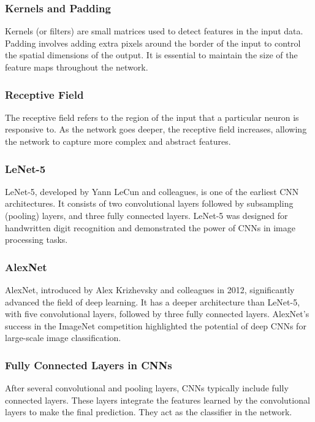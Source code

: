 \documentclass[english,11pt,a4paper,titlepage]{article}
\begin{document}
	\subsubsection*{Kernels and Padding}
	Kernels (or filters) are small matrices used to detect features in the input data. Padding involves adding extra pixels around the border of the input to control the spatial dimensions of the output. It is essential to maintain the size of the feature maps throughout the network.
	
	\subsubsection*{Receptive Field}
	The receptive field refers to the region of the input that a particular neuron is responsive to. As the network goes deeper, the receptive field increases, allowing the network to capture more complex and abstract features.
	
	\subsubsection*{LeNet-5}
	LeNet-5, developed by Yann LeCun and colleagues, is one of the earliest CNN architectures. It consists of two convolutional layers followed by subsampling (pooling) layers, and three fully connected layers. LeNet-5 was designed for handwritten digit recognition and demonstrated the power of CNNs in image processing tasks.
	
	\subsubsection*{AlexNet}
	AlexNet, introduced by Alex Krizhevsky and colleagues in 2012, significantly advanced the field of deep learning. It has a deeper architecture than LeNet-5, with five convolutional layers, followed by three fully connected layers. AlexNet's success in the ImageNet competition highlighted the potential of deep CNNs for large-scale image classification.
	
	\subsubsection*{Fully Connected Layers in CNNs}
	After several convolutional and pooling layers, CNNs typically include fully connected layers. These layers integrate the features learned by the convolutional layers to make the final prediction. They act as the classifier in the network.
	
\end{document}
